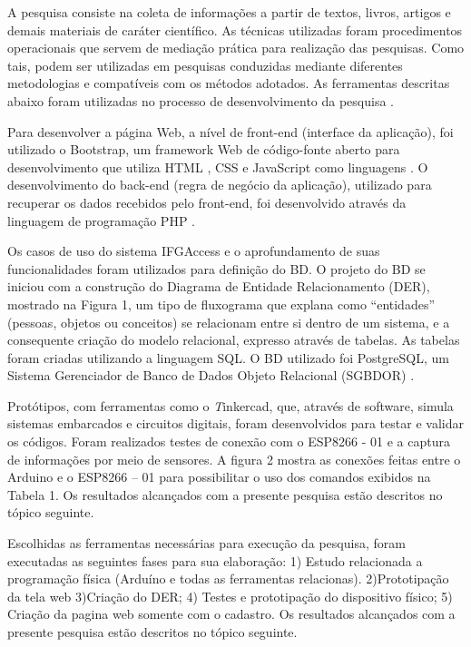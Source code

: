 A pesquisa consiste na coleta de informações a partir de textos, livros, artigos e demais materiais de caráter científico. As técnicas utilizadas foram procedimentos operacionais que servem de mediação prática para realização das pesquisas. Como tais, podem ser utilizadas em pesquisas conduzidas mediante diferentes metodologias e compatíveis com os métodos adotados. As ferramentas descritas abaixo foram utilizadas no processo de desenvolvimento da pesquisa \citep{metodolai}.

Para desenvolver a página Web, a nível de front-end (interface da aplicação), foi utilizado o Bootstrap, um framework Web de código-fonte aberto para desenvolvimento que utiliza HTML \cite{w3c}, CSS \cite{w3c} e JavaScript \cite{w3c} como linguagens \cite{build}. O desenvolvimento do back-end (regra de negócio da aplicação), utilizado para recuperar os dados recebidos pelo front-end, foi desenvolvido através da linguagem de programação PHP \cite{w3c}. 

Os casos de uso do sistema IFGAccess e o aprofundamento de suas funcionalidades foram utilizados para definição do BD. O projeto do BD se iniciou com a construção do Diagrama de Entidade Relacionamento (DER), mostrado na Figura 1, um tipo de fluxograma que explana como “entidades” (pessoas, objetos ou conceitos) se relacionam entre si dentro de um sistema, e a consequente criação do modelo relacional, expresso através de tabelas. As tabelas foram criadas utilizando a linguagem SQL. O BD utilizado foi PostgreSQL, um Sistema Gerenciador de Banco de Dados Objeto Relacional (SGBDOR) \cite{php}.

Protótipos, com ferramentas como o {\textit Tinkercad}, que, através de software, simula sistemas embarcados e circuitos digitais, foram desenvolvidos para testar e validar os códigos. Foram realizados testes de conexão com o ESP8266 - 01 e a captura de informações por meio de sensores. A figura 2 mostra as conexões feitas entre o Arduino e o ESP8266 – 01 para possibilitar o uso dos comandos exibidos na Tabela 1. Os resultados alcançados com a presente pesquisa estão descritos no tópico seguinte.

Escolhidas as ferramentas necessárias para execução da pesquisa, foram executadas as seguintes fases para sua elaboração: 1) Estudo relacionada a programação física (Arduíno e todas as ferramentas relacionas). 2)Prototipação da tela web 3)Criação do DER; 4)  Testes e prototipação do dispositivo físico; 5) Criação da pagina web somente com o cadastro.  Os resultados alcançados com a presente pesquisa estão descritos no tópico seguinte.